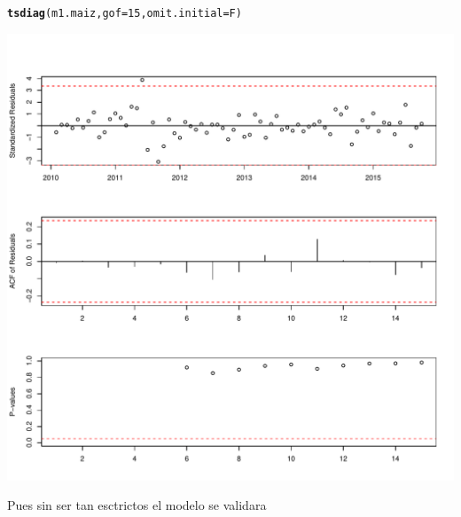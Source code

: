 \documentclass{article}\usepackage[]{graphicx}\usepackage[]{color}
\makeatletter
\def\maxwidth{ %
  \ifdim\Gin@nat@width>\linewidth
    \linewidth
  \else
    \Gin@nat@width
  \fi
}
\newcommand{\hlnum}[1]{\textcolor[rgb]{0.686,0.059,0.569}{#1}}%
\newcommand{\hlstd}[1]{\textcolor[rgb]{0.345,0.345,0.345}{#1}}%
\newcommand{\hlkwc}[1]{\textcolor[rgb]{0.333,0.667,0.333}{#1}}%
\newcommand{\hlkwd}[1]{\textcolor[rgb]{0.737,0.353,0.396}{\textbf{#1}}}%
\newenvironment{kframe}{%
 \def\at@end@of@kframe{}%
 \ifinner\ifhmode%
  \def\at@end@of@kframe{\end{minipage}}%
  \begin{minipage}{\columnwidth}%
 \fi\fi%
 \def\FrameCommand##1{\hskip\@totalleftmargin \hskip-\fboxsep
 \colorbox{shadecolor}{##1}\hskip-\fboxsep
     \hskip-\linewidth \hskip-\@totalleftmargin \hskip\columnwidth}%
 \MakeFramed {\advance\hsize-\width
   \@totalleftmargin\z@ \linewidth\hsize
   \@setminipage}}%
 {\par\unskip\endMakeFramed%
 \at@end@of@kframe}
\newenvironment{knitrout}{}{} %
\makeatother
\begin{document}
\begin{knitrout}
\begin{kframe}\begin{alltt}
\hlkwd{tsdiag}\hlstd{(m1.maiz,}\hlkwc{gof}\hlstd{=}\hlnum{15}\hlstd{,}\hlkwc{omit.initial}\hlstd{=F)}
\end{alltt}
\end{kframe}
\includegraphics[width=\maxwidth]{figure/unnamed-chunk-5-4} 

\end{knitrout}

Pues sin ser tan esctrictos el modelo se validara
\end{document}
